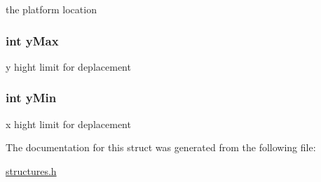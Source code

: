 the platform location \hypertarget{structplatform_a7ca443cbb568e95510880b6ec54dbe5e}{
\subsubsection[{y\-Max}]{\setlength{\rightskip}{0pt plus 5cm}int y\-Max}}\label{structplatform_a7ca443cbb568e95510880b6ec54dbe5e}
y hight limit for deplacement \hypertarget{structplatform_abd0259c29e89b8f4ee318478bf207cf8}{
\subsubsection[{y\-Min}]{\setlength{\rightskip}{0pt plus 5cm}int y\-Min}}\label{structplatform_abd0259c29e89b8f4ee318478bf207cf8}
x hight limit for deplacement 

The documentation for this struct was generated from the following file\-:\begin{DoxyCompactItemize}
\item 
\hyperlink{structures_8h}{structures.\-h}\end{DoxyCompactItemize}
